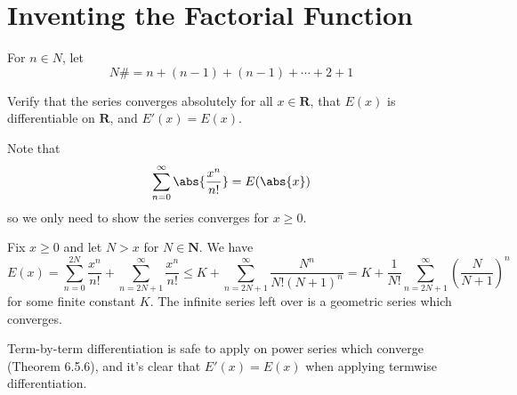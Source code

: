 \section{Inventing the Factorial Function}
\begin{exercise}
For \(n \in N\), let
\[N\# = n + (n-1) + (n-1) + \cdots + 2 + 1\]
\end{exercise}
\begin{solution}
\end{solution}
\begin{exercise}
Verify that the series converges absolutely for all \(x \in \mathbf{R}\), that \(E(x)\) is differentiable on \(\mathbf{R}\), and \(E'(x) = E(x)\).
\end{exercise}
\begin{solution}
Note that
\[\sum^\infty_{n=0} \abs{\frac{x^n}{n!}} = E(\abs{x})\]
so we only need to show the series converges for \(x \geq 0\).

Fix \(x \geq 0\) and let \(N > x\) for \(N \in \mathbf{N}\). We have
\[E(x) = \sum^{2N}_{n=0} \frac{x^n}{n!} + \sum_{n=2N+1}^\infty \frac{x^n}{n!} \leq K + \sum_{n=2N+1}^\infty \frac{N^n}{N!(N+1)^n} = K + \frac{1}{N!}\sum_{n=2N+1}^\infty \left(\frac{N}{N+1}\right)^n\]
for some finite constant \(K\). The infinite series left over is a geometric series which converges.

Term-by-term differentiation is safe to apply on power series which converge (Theorem 6.5.6), and it's clear that \(E'(x) = E(x)\) when applying termwise differentiation.
\end{solution}

